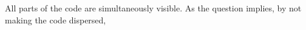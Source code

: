 All parts of the code are simultaneously visible. 
As the question implies, by not making the code dispersed, 




















